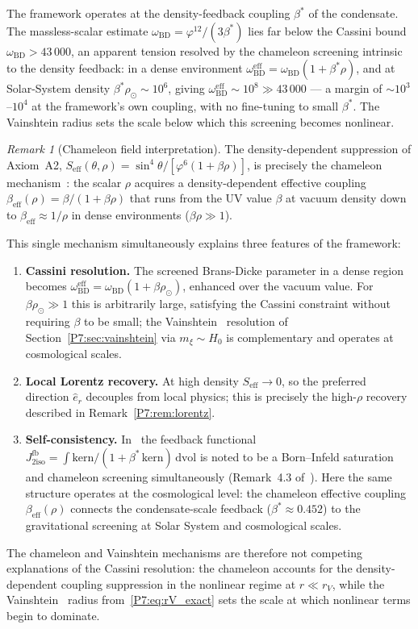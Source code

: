 \documentclass[11pt,a4paper]{article}
\theoremstyle{definition}
\theoremstyle{remark}
\newtheorem{remark}[theorem]{Remark}
\newcommand{\vp}{\varphi}
\newcommand{\bst}{\beta^{*}}
\newcommand{\oBD}{\omega_{\mathrm{BD}}}
\newcommand{\Jfb}{J_{2\mathrm{iso}}^{\mathrm{fb}}}
\begin{document}
The framework operates at the density-feedback coupling $\bst$ of the
condensate.  The massless-scalar estimate $\oBD=\vp^{12}/(3\bst)$ lies far
below the Cassini bound $\oBD>43\,000$, an apparent tension resolved by
the chameleon screening intrinsic to the density feedback: in a dense
environment $\oBD^{\mathrm{eff}}=\oBD(1+\bst\rho)$, and at Solar-System
density $\bst\rho_\odot\sim10^{6}$, giving $\oBD^{\mathrm{eff}}\sim10^{8}
\gg43\,000$ --- a margin of $\sim10^{3}$--$10^{4}$ at the framework's own
coupling, with no fine-tuning to small $\bst$.  The Vainshtein radius sets
the scale below which this screening becomes nonlinear.

\begin{remark}[Chameleon field interpretation]
\label{P7:rem:chameleon}
The density-dependent suppression of Axiom~A2,
$S_{\mathrm{eff}}(\theta,\rho) = \sin^4\!\theta/[\vp^6(1+\beta\rho)]$,
is precisely the chameleon mechanism~\cite{KhouryWeltman2004}: the scalar $\rho$
acquires a density-dependent effective coupling
$\beta_{\mathrm{eff}}(\rho) = \beta/(1+\beta\rho)$
that runs from the UV value $\beta$ at vacuum density down to
$\beta_{\mathrm{eff}}\approx1/\rho$ in dense environments ($\beta\rho\gg1$).

This single mechanism simultaneously explains three features of the framework:
\begin{enumerate}[noitemsep,label=\emph{(\roman*)}]
  \item \textbf{Cassini resolution.}  The screened Brans-Dicke parameter
    in a dense region becomes $\oBD^{\mathrm{eff}} = \oBD(1+\beta\rho_\odot)$,
    enhanced over the vacuum value.  For $\beta\rho_\odot\gg1$ this is
    arbitrarily large, satisfying the Cassini constraint without requiring
    $\beta$ to be small; the Vainshtein~\cite{Vainshtein1972} resolution of Section~\ref{P7:sec:vainshtein}
    via $m_\xi\sim H_0$ is complementary and operates at cosmological scales.
  \item \textbf{Local Lorentz recovery.}  At high density
    $S_{\mathrm{eff}}\to0$, so the preferred direction $\hat{e}_r$
    decouples from local physics; this is precisely the high-$\rho$
    recovery described in Remark~\ref{P7:rem:lorentz}.
  \item \textbf{Self-consistency.}  In~\cite{Paper1} the feedback
    functional $\Jfb = \int\mathrm{kern}/(1+\bst\,\mathrm{kern})\,\mathrm{dvol}$
    is noted to be a Born--Infeld saturation and chameleon screening
    simultaneously (Remark~4.3 of~\cite{Paper1}).
    Here the same structure operates at the cosmological level:
    the chameleon effective coupling $\beta_{\mathrm{eff}}(\rho)$
    connects the condensate-scale feedback ($\bst\approx0.452$) to
    the gravitational screening at Solar System and cosmological scales.
\end{enumerate}
The chameleon and Vainshtein mechanisms are therefore not competing
explanations of the Cassini resolution: the chameleon accounts for the
density-dependent coupling suppression in the nonlinear regime at
$r\ll r_V$, while the Vainshtein~\cite{Vainshtein1972} radius from~\eqref{P7:eq:rV_exact} sets the
scale at which nonlinear terms begin to dominate.
\end{remark}
\end{document}
